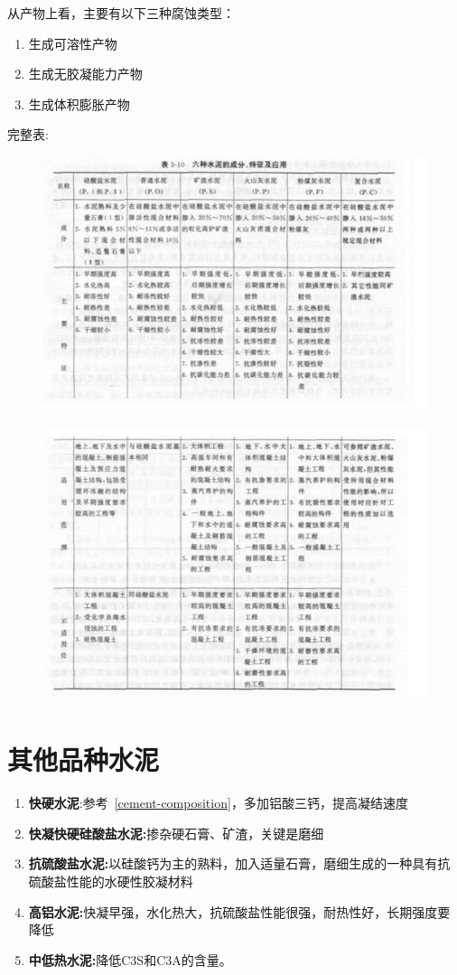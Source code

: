 \documentclass[12pt, a4paper, oneside, UTF8]{ctexbook}
\begin{document}
从产物上看，主要有以下三种腐蚀类型：
\begin{enumerate}
	\item 生成可溶性产物
	\item 生成无胶凝能力产物
	\item 生成体积膨胀产物
\end{enumerate}

\newpage
完整表:

\begin{figure}[htbp]
	\centering
	\includegraphics[width=0.7\linewidth]{../figure/sn1.png} %
	\caption{}
	\label{fig:sn1}
\end{figure}

\begin{figure}[H]
	\centering
	\includegraphics[width=0.7\linewidth]{../figure/sn2.png} %
	\caption{}
	\label{fig:sn2}
\end{figure}

\newpage

\section{其他品种水泥}

\begin{enumerate}
	\item \textbf{快硬水泥}:参考~\ref{cement-composition}，多加铝酸三钙，提高凝结速度
	\item \textbf{快凝快硬硅酸盐水泥:}掺杂硬石膏、矿渣，关键是磨细
	\item \textbf{抗硫酸盐水泥:}以硅酸钙为主的熟料，加入适量石膏，磨细生成的一种具有抗硫酸盐性能的水硬性胶凝材料
	\item \textbf{高铝水泥:}快凝早强，水化热大，抗硫酸盐性能很强，耐热性好，长期强度要降低
	\item \textbf{中低热水泥:}降低C3S和C3A的含量。
\end{enumerate}
\end{document}
